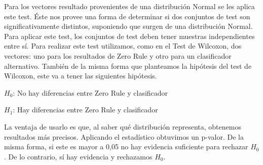 

Para los vectores resultado provenientes de una distribución Normal se les aplica este test. Éste nos provee una forma de determinar si dos conjuntos de test son significativamente distintos, suponiendo que surgen de una distribución Normal.
Para aplicar este test, los conjuntos de test deben tener muestras independientes entre sí. Para realizar este test utilizamos, como en el Test de Wilcoxon, dos vectores: uno para los resultados de Zero Rule y otro para un clasificador alternativo. 
También de la misma forma que planteamos la hipótesis del test de Wilcoxon, este va a tener las siguientes hipótesis. 

\vspace{0.5cm}
\hspace{2cm}$H_0$: No hay diferencias entre Zero Rule y clasificador
\vspace{0.25cm}

\hspace{2cm}$H_1$: Hay diferencias entre Zero Rule y clasificador
\vspace{0.5cm}

La ventaja de usarlo es que, al saber qué distribución representa, obtenemos resultados más precisos. Aplicando el estadístico obtuvimos un p-valor. De la misma forma, si este es mayor a 0,05 no hay evidencia suficiente para rechazar $H_0$. De lo contrario, sí hay evidencia y rechazamos $H_0$.

